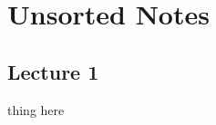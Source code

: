 \documentclass[../m157main.tex]{subfiles}
\begin{document}
\chapter{Unsorted Notes}
\section{Lecture 1}
thing here
\end{document}
